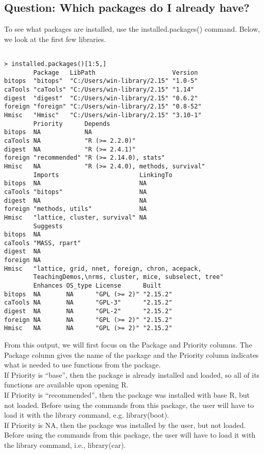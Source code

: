 \documentclass[12pt]{article}
\begin{document}
\subsection{Question: Which packages do I already have?}
To see what packages are installed, use the installed.packages() command. Below, we look at the first few libraries.
\begin{verbatim}

> installed.packages()[1:5,]
        Package   LibPath                     Version 
bitops  "bitops"  "C:/Users/win-library/2.15" "1.0-5" 
caTools "caTools" "C:/Users/win-library/2.15" "1.14"  
digest  "digest"  "C:/Users/win-library/2.15" "0.6.2" 
foreign "foreign" "C:/Users/win-library/2.15" "0.8-52"
Hmisc   "Hmisc"   "C:/Users/win-library/2.15" "3.10-1"
        Priority      Depends                          
bitops  NA            NA                               
caTools NA            "R (>= 2.2.0)"                   
digest  NA            "R (>= 2.4.1)"                   
foreign "recommended" "R (>= 2.14.0), stats"           
Hmisc   NA            "R (>= 2.4.0), methods, survival"
        Imports                      LinkingTo
bitops  NA                           NA       
caTools "bitops"                     NA       
digest  NA                           NA       
foreign "methods, utils"             NA       
Hmisc   "lattice, cluster, survival" NA       
        Suggests                                                                                           
bitops  NA                                                                                                 
caTools "MASS, rpart"                                                                                      
digest  NA                                                                                                 
foreign NA                                                                                                 
Hmisc   "lattice, grid, nnet, foreign, chron, acepack, 
		TeachingDemos,\nrms, cluster, mice, subselect, tree"
        Enhances OS_type License      Built   
bitops  NA       NA      "GPL (>= 2)" "2.15.2"
caTools NA       NA      "GPL-3"      "2.15.2"
digest  NA       NA      "GPL-2"      "2.15.2"
foreign NA       NA      "GPL (>= 2)" "2.15.2"
Hmisc   NA       NA      "GPL (>= 2)" "2.15.2"
\end{verbatim}

From this output, we will first focus on the Package and Priority columns. The Package column gives the name of the package and the Priority column indicates what is needed to use functions from the package.\\
If Priority is ``base'', then the package is already installed and loaded, so all of its functions are available upon opening R.\\
If Priority is ``recommended'', then the package was installed with base R, but not loaded. Before using the commands from this package, the user will have to load it with the library command, e.g. library(boot).\\
If Priority is NA, then the package was installed by the user, but not loaded. Before using the commands from this package, the user will have to load it with the library command, i.e., library(car).\\
\end{document}
